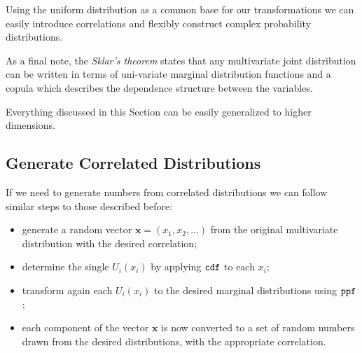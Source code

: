 Using the uniform distribution as a common base for our transformations
we can easily introduce correlations and flexibly construct complex
probability distributions. 

As a final note, the \emph{Sklar's theorem} states that any multivariate joint distribution
can be written in terms of uni-variate marginal distribution functions
and a copula which describes the dependence structure between the
variables.

Everything discussed in this Section can be easily generalized to higher dimensions.




\subsection{Generate Correlated Distributions}\label{generate-correlated-distributions}

If we need to generate numbers from correlated distributions we can
follow similar steps to those described before:

\begin{itemize}
\tightlist
\item
  generate a random vector \(\mathbf{x}=(x_1, x_2,\ldots)\) from the
  original multivariate distribution with the desired correlation;
\item
  determine the single \(U_i(x_i)\) by applying \(\tt{cdf}\) to each
  \(x_i\);
\item
  transform again each \(U_i(x_i)\) to the desired marginal
  distributions using \(\tt{ppf}\);
\item
  each component of the vector \(\mathbf{x}\) is now converted to a set
  of random numbers drawn from the desired distributions, with the
  appropriate correlation.
\end{itemize}


